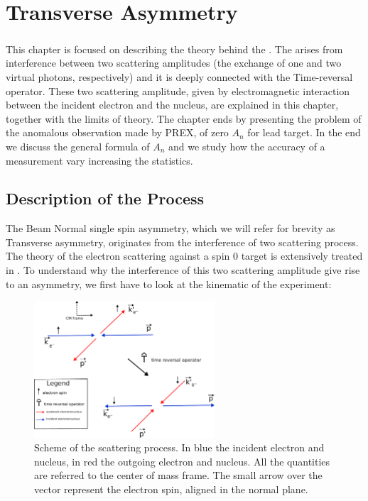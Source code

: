
\chapter{Transverse Asymmetry} \label{transv}

\paragraph{}
This chapter is focused on describing the theory behind the \transv. The \transv arises from interference between two scattering amplitudes (the exchange of one and two virtual photons, respectively) and it is deeply connected with the Time-reversal operator. These two scattering amplitude, given by electromagnetic interaction between the incident electron and the nucleus, are explained in this chapter, together with the limits of theory. The chapter ends by presenting the problem of the anomalous observation made by PREX, of zero $A_{n}$ for lead target. In the end we discuss the general formula of $A_{n}$ and we study how the accuracy of a measurement vary increasing the statistics. 

\section{Description of the Process}

The Beam Normal single spin asymmetry, which we will refer for brevity as Transverse asymmetry, originates from the interference of two scattering process. The theory of the electron scattering against a spin $0$ target is extensively treated in \cite{Gorchtein_2008}.
To understand why the interference of this two scattering amplitude give rise to an asymmetry, we first have to look at the kinematic of the experiment:  \newline

\begin{figure}[hbtp]
\centering
\includegraphics[width = 0.6\textwidth]{Transverse/scattering.pdf}
\caption{Scheme of the scattering process. In blue the incident electron and nucleus, in red the outgoing electron and nucleus. All the quantities are referred to the center of mass frame. The small arrow over the vector represent the electron spin, aligned in the normal plane.}
\end{figure}

